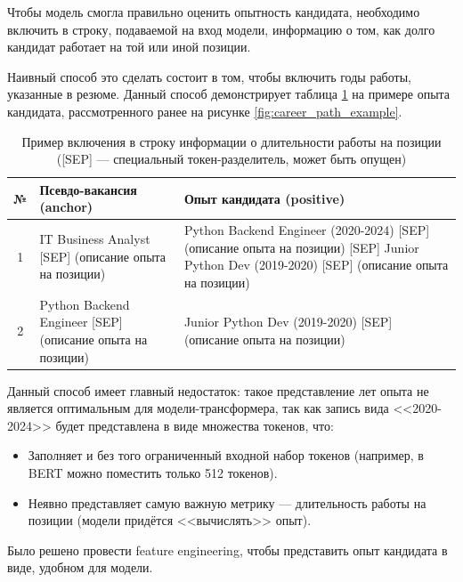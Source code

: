 \documentclass[14pt]{mmcs_article}
\begin{document}
Чтобы модель смогла правильно оценить опытность кандидата, необходимо включить в строку, подаваемой на вход модели, информацию о том, как долго кандидат работает на той или иной позиции.

Наивный способ это сделать состоит в том, чтобы включить годы работы, указанные в резюме. Данный способ демонстрирует таблица \ref{tab:position_encoding_example} на примере опыта кандидата, рассмотренного ранее на рисунке \ref{fig:career_path_example}.

\begin{table}[H]
  \centering
  \caption{\centering Пример включения в строку информации о длительности работы на позиции ([SEP] --- специальный токен-разделитель, может быть опущен)}
  \label{tab:position_encoding_example}
  \begin{tabular}{|c|p{7cm}|p{7cm}|}
    \hline
    \textbf{№} & \textbf{Псевдо-вакансия (anchor)}                         & \textbf{Опыт кандидата (positive)}                                                                                                          \\
    \hline
    1          & IT Business Analyst [SEP] (описание опыта на позиции)     & Python Backend Engineer (2020-2024) [SEP] (описание опыта на позиции) [SEP] Junior Python Dev (2019-2020) [SEP] (описание опыта на позиции) \\
    \hline
    2          & Python Backend Engineer [SEP] (описание опыта на позиции) & Junior Python Dev (2019-2020) [SEP] (описание опыта на позиции)                                                                             \\
    \hline
  \end{tabular}
\end{table}

Данный способ имеет главный недостаток: такое представление лет опыта не является оптимальным для модели-трансформера, так как запись вида <<2020-2024>> будет представлена в виде множества токенов, что:

\begin{itemize}
  \item Заполняет и без того ограниченный входной набор токенов (например, в BERT можно поместить только 512 токенов).
  \item Неявно представляет самую важную метрику — длительность работы на позиции (модели придётся <<вычислять>> опыт).
\end{itemize}

Было решено провести feature engineering, чтобы представить опыт кандидата в виде, удобном для модели.
\end{document}
